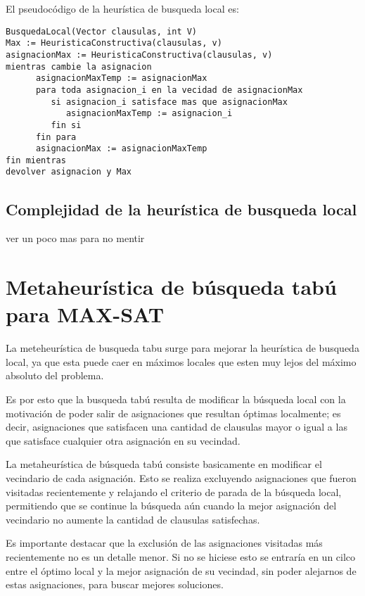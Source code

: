 \documentclass[a4paper,10pt]{article}
\begin{document}
El pseudoc\'odigo de la heur\'istica de busqueda local es:

\begin{verbatim}
BusquedaLocal(Vector clausulas, int V)
Max := HeuristicaConstructiva(clausulas, v)
asignacionMax := HeuristicaConstructiva(clausulas, v)
mientras cambie la asignacion
      asignacionMaxTemp := asignacionMax
      para toda asignacion_i en la vecidad de asignacionMax
         si asignacion_i satisface mas que asignacionMax
            asignacionMaxTemp := asignacion_i
         fin si
      fin para
      asignacionMax := asignacionMaxTemp
fin mientras
devolver asignacion y Max
\end{verbatim}

\subsection*{Complejidad de la heur\'istica de busqueda local}

ver un poco mas para no mentir



\section*{Metaheur\'istica de b\'usqueda tab\'u para MAX-SAT}

La meteheur\'istica de busqueda tabu surge para mejorar la heur\'istica de busqueda local, ya que esta puede caer en m\'aximos locales que esten muy lejos del m\'aximo absoluto del problema.

Es por esto que la busqueda tab\'u resulta de modificar la b\'usqueda local con la motivaci\'on de poder salir de asignaciones que resultan \'optimas localmente; es decir, asignaciones que satisfacen una cantidad de clausulas mayor o igual a las que satisface cualquier otra asignaci\'on en su vecindad.

La metaheur\'istica de b\'usqueda tab\'u consiste basicamente en modificar el vecindario de cada asignaci\'on. Esto se realiza excluyendo asignaciones que fueron visitadas recientemente y relajando el criterio de parada de la b\'usqueda local, permitiendo que se continue la b\'usqueda a\'un cuando la mejor asignaci\'on del vecindario no aumente la cantidad de clausulas satisfechas. 

Es importante destacar que la exclusi\'on de las asignaciones visitadas m\'as recientemente no es un detalle menor. Si no se hiciese esto se entrar\'ia en un cilco entre el \'optimo local y la mejor asignaci\'on de su vecindad, sin poder alejarnos de estas asignaciones, para buscar mejores soluciones.
\end{document}
